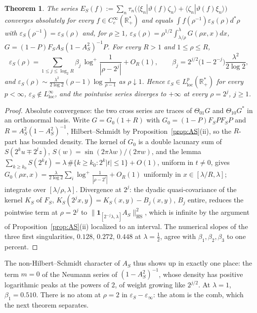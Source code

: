 \documentclass[11pt]{amsart}
\newtheorem{theorem}{Theorem}[section]
\theoremstyle{definition}
\theoremstyle{remark}
\newcommand{\R}{\mathbb R}
\begin{document}
\begin{theorem}\label{thm:L2}
The series $E_S(f):=\sum_n\tau_n\big(\langle\xi_n|\vartheta(f)\zeta_n\rangle+\langle\zeta_n|\vartheta(f)\xi_n\rangle\big)$ converges
absolutely for every $f\in C_c^\infty(\R_+^*)$ and equals $\int f(\rho^{-1})\varepsilon_S(\rho)d^*\rho$ with
$\varepsilon_S(\rho^{-1})=\varepsilon_S(\rho)$ and, for $\rho\ge1$,
$\varepsilon_S(\rho)=\rho^{1/2}\int_{\lambda/\rho}^\lambda G(\rho x,x)dx$, $G=(1-P)F_SA_S(1-A_S^2)^{-1}P$. For every $R>1$ and
$1\le\rho\le R$,
\[
\varepsilon_S(\rho)=\sum_{1\le j\le\log_2R}\beta_j\,\log^+\frac1{|\rho-2^j|}+O_R(1),\qquad
\beta_j=2^{j/2}\big(1-2^{-j}\big)\frac{\lambda^2}{2\log2},
\]
and $\varepsilon_S(\rho)\sim\frac{\lambda^2}{2\log2}(\rho-1)\log\frac1{\rho-1}$ as $\rho\downarrow1$. Hence
$\varepsilon_S\in L^p_{\mathrm{loc}}(\R_+^*)$ for every $p<\infty$, $\varepsilon_S\notin L^\infty_{\mathrm{loc}}$, and the pointwise
series diverges to $+\infty$ at every $\rho=2^j$, $j\ge1$.
\end{theorem}
\begin{proof}
Absolute convergence: the two cross series are traces of $\Theta_{01}G$ and $\Theta_{10}G^*$ in an orthonormal basis.
Write $G=G_0(1+R)$ with $G_0=(1-P)F_SPF_SP$ and $R=A_S^2(1-A_S^2)^{-1}$, Hilbert--Schmidt by Proposition~\ref{prop:AS}(ii), so
the $R$-part has bounded density. The kernel of $G_0$ is a double lacunary sum of $S(2^ku\mp2^lz)$,
$S(w)=\sin(2\pi\lambda w)/(2\pi w)$, and the lemma $\sum_{k\ge k_0}S(2^kt)=\lambda\,\#\{k\ge k_0:2^k|t|\le1\}+O(1)$, uniform in
$t\neq0$, gives $G_0(\rho x,x)=\frac{\lambda}{2\log2}\sum_i\log^+\frac1{|\rho-2^i|}+O_R(1)$ uniformly in $x\in[\lambda/R,\lambda]$;
integrate over $[\lambda/\rho,\lambda]$. Divergence at $2^j$: the dyadic quasi-covariance of the kernel $K_S$ of $F_S$, $K_S(2^jx,y)=K_S(x,y)-B_j(x,y)$, $B_j$
entire, reduces the pointwise term at $\rho=2^j$ to $\|\mathbf 1_{[2^{-j}\lambda,\lambda]}A_S\|_{\mathrm{HS}}^2$, which is infinite
by the argument of Proposition~\ref{prop:AS}(ii) localized to an interval. The numerical slopes of the three first
singularities, $0.128$, $0.272$, $0.448$ at $\lambda=\frac12$, agree with $\beta_1,\beta_2,\beta_3$ to one percent.
\end{proof}

The non-Hilbert--Schmidt character of $A_S$ thus shows up in exactly one place: the term $m=0$ of the Neumann series of
$(1-A_S^2)^{-1}$, whose density has positive logarithmic peaks at the powers of $2$, of weight growing like $2^{j/2}$. At
$\lambda=1$, $\beta_1=0.510$. There is no atom at $\rho=2$ in $\varepsilon_S-\varepsilon_\infty$: the atom is the comb, which
the next theorem separates.
\end{document}

